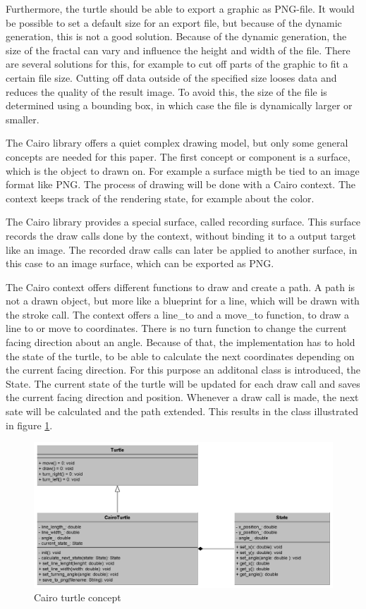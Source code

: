 \documentclass[english]{cpp-hmwk}
\begin{document}
Furthermore, the turtle should be able to export a graphic as PNG-file. It would be possible to set a default size for an export file, but because of the dynamic generation, this is not a good solution. Because of the dynamic generation, the size of the fractal can vary and influence the height and width of the file. There are several solutions for this, for example to cut off parts of the graphic to fit a certain file size. Cutting off data outside of the specified size looses data and reduces the quality of the result image. To avoid this, the size of the file is determined using a bounding box, in which case the file is dynamically larger or smaller.\newline

\noindent The Cairo library offers a quiet complex drawing model, but only some general concepts are needed for this paper. The first concept or component is a surface, which is the object to drawn on. For example a surface migth be tied to an image format like PNG. The process of drawing will be done with a Cairo context. The context keeps track of the rendering state, for example about the color.

The Cairo library provides a special surface, called recording surface. This surface records the draw calls done by the context, without binding it to a output target like an image. The recorded draw calls can later be applied to another surface, in this case to an image surface, which can be exported as PNG.

The Cairo context offers different functions to draw and create a path. A path is not a drawn object, but more like a blueprint for a line, which will be drawn with the stroke call. The context offers a line\_to and a move\_to function, to draw a line to or move to coordinates. There is no turn function to change the current facing direction about an angle. Because of that, the implementation has to hold the state of the turtle, to be able to calculate the next coordinates depending on the current facing direction. For this purpose an additonal class is introduced, the State. The current state of the turtle will be updated for each draw call and saves the current facing direction and position. Whenever a draw call is made, the next sate will be calculated and the path extended. This results in the class illustrated in figure \ref{figure:cairoturtle}.

\begin{figure}[h!]
	\centering
	\includegraphics[width=1\columnwidth]{../graphs/class_cairo_turtle.png}
	\caption{Cairo turtle concept}
	\label{figure:cairoturtle}
\end{figure}
\end{document}

